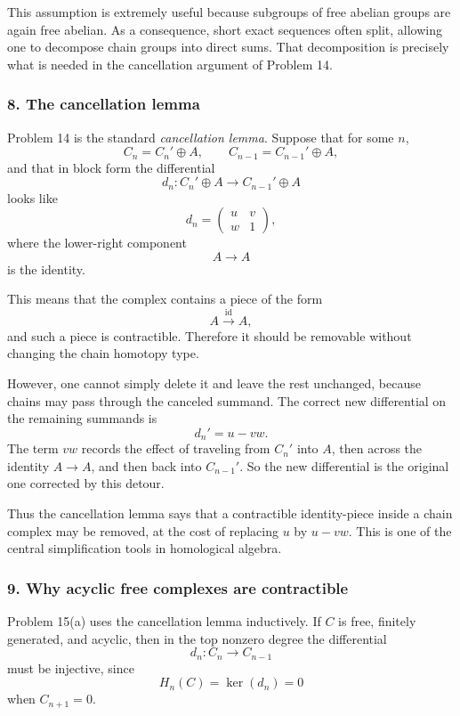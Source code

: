 \documentclass[12pt,a4paper]{article}
\theoremstyle{notespace}
\begin{document}
This assumption is extremely useful because subgroups of free abelian groups are again free abelian. As a consequence, short exact sequences often split, allowing one to decompose chain groups into direct sums. That decomposition is precisely what is needed in the cancellation argument of Problem 14.

\subsubsection*{8. The cancellation lemma}

Problem 14 is the standard \emph{cancellation lemma}. Suppose that for some \(n\),
\[
C_n=C_n'\oplus A,\qquad C_{n-1}=C_{n-1}'\oplus A,
\]
and that in block form the differential
\[
d_n:C_n'\oplus A\to C_{n-1}'\oplus A
\]
looks like
\[
d_n=
\begin{pmatrix}
	u & v\\
	w & 1
\end{pmatrix},
\]
where the lower-right component
\[
A\to A
\]
is the identity.

This means that the complex contains a piece of the form
\[
A\xrightarrow{\mathrm{id}}A,
\]
and such a piece is contractible. Therefore it should be removable without changing the chain homotopy type.

However, one cannot simply delete it and leave the rest unchanged, because chains may pass through the canceled summand. The correct new differential on the remaining summands is
\[
d_n'=u-vw.
\]
The term \(vw\) records the effect of traveling from \(C_n'\) into \(A\), then across the identity \(A\to A\), and then back into \(C_{n-1}'\). So the new differential is the original one corrected by this detour.

Thus the cancellation lemma says that a contractible identity-piece inside a chain complex may be removed, at the cost of replacing \(u\) by \(u-vw\). This is one of the central simplification tools in homological algebra.

\subsubsection*{9. Why acyclic free complexes are contractible}

Problem 15(a) uses the cancellation lemma inductively. If \(C\) is free, finitely generated, and acyclic, then in the top nonzero degree the differential
\[
d_n:C_n\to C_{n-1}
\]
must be injective, since
\[
H_n(C)=\ker(d_n)=0
\]
when \(C_{n+1}=0\).
\end{document}
